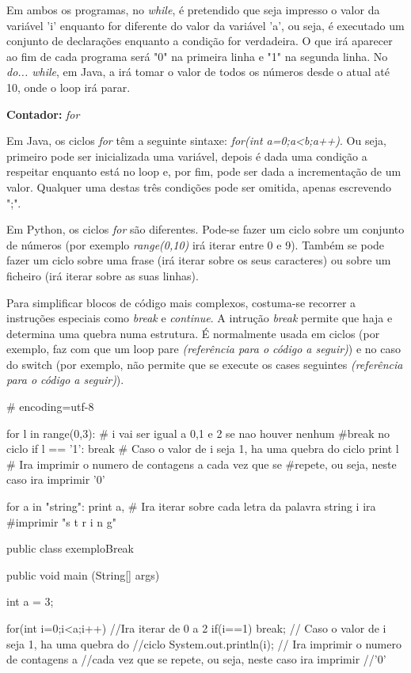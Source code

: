 \documentclass[11pt,openright,twoside]{report}
\begin{document}
Em ambos os programas, no \textit{while}, é pretendido que seja impresso o valor da variável 'i' enquanto for diferente do valor da variável 'a', ou seja, é executado um conjunto de declarações enquanto a condição for verdadeira. O que irá aparecer ao fim de cada programa será "0" na primeira linha e "1" na segunda linha.
No \textit{do... while}, em Java, a irá tomar o valor de todos os números desde o atual até 10, onde o loop irá parar.
\medskip

\textbf{Contador:} \textit{for}

Em Java, os ciclos \textit{for} têm a seguinte sintaxe: \textit{for(int a=0;a\textless b;a++)}. Ou seja, primeiro pode ser inicializada uma variável, depois é dada uma condição a respeitar enquanto está no loop e, por fim, pode ser dada a incrementação de um valor. Qualquer uma destas três condições pode ser omitida, apenas escrevendo ";".
\smallskip

Em Python, os ciclos \textit{for} são diferentes. Pode-se fazer um ciclo sobre um conjunto de números (por exemplo \textit{range(0,10)} irá iterar entre 0 e 9). Também se pode fazer um ciclo sobre uma frase (irá iterar sobre os seus caracteres) ou sobre um ficheiro (irá iterar sobre as suas linhas).
\smallskip

Para simplificar blocos de código mais complexos, costuma-se recorrer a instruções especiais como \textit{break} e \textit{continue}.
A intrução \textit{break} permite que haja e determina uma quebra numa estrutura. É normalmente usada em ciclos (por exemplo, faz com que um loop pare \textit{(referência para o código a seguir)}) e no caso do switch (por exemplo, não permite que se execute os cases seguintes \textit{(referência para o código a seguir)}).

\smallskip
\begin{Python}
# encoding=utf-8

for l in range(0,3):	# i vai ser igual a 0,1 e 2 se nao houver nenhum #break no ciclo
	if l == '1':
		break 			# Caso o valor de i seja 1, ha uma quebra do ciclo 
	print l 			# Ira imprimir o numero de contagens a cada vez que se #repete, ou seja, neste caso ira imprimir '0'
	
for a in "string":
	print a,				# Ira iterar sobre cada letra da palavra string i ira #imprimir "s t r i n g"
\end{Python}
\smallskip

\smallskip
\begin{Java}
public class exemploBreak{
	public void main (String[] args){
		int a = 3;
		
		for(int i=0;i<a;i++){	//Ira iterar de 0 a 2
			if(i==1) break; 	// Caso o valor de i seja 1, ha uma quebra do //ciclo
			System.out.println(i); // Ira imprimir o numero de contagens a //cada vez que se repete, ou seja, neste caso ira imprimir //'0'
		}
	}
}
\end{Java}
\smallskip
\end{document}
